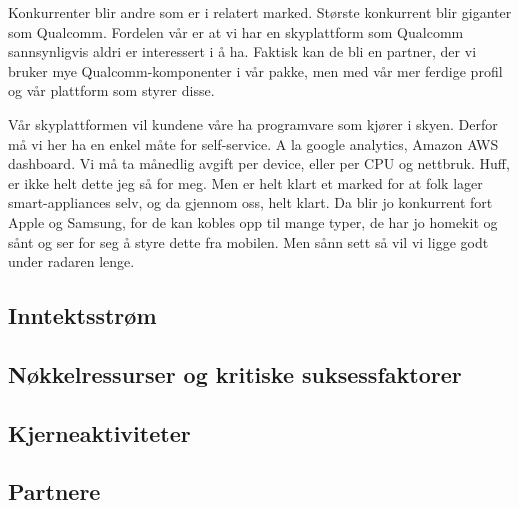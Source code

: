 Konkurrenter blir andre som er i relatert marked. Største konkurrent blir
giganter som Qualcomm. Fordelen vår er at vi har en skyplattform som Qualcomm
sannsynligvis aldri er interessert i å ha. Faktisk kan de bli en partner, der
vi bruker mye Qualcomm-komponenter i vår pakke, men med vår mer ferdige profil
og vår plattform som styrer disse.

Vår skyplattformen vil kundene våre ha programvare som kjører i skyen. Derfor
må vi her ha en enkel måte for self-service. A la google analytics, Amazon AWS
dashboard. Vi må ta månedlig avgift per device, eller per CPU og nettbruk.
Huff, er ikke helt dette jeg så for meg. Men er helt klart et marked for at
folk lager smart-appliances selv, og da gjennom oss, helt klart. Da blir jo
konkurrent fort Apple og Samsung, for de kan kobles opp til mange typer, de har
jo homekit og sånt og ser for seg å styre dette fra mobilen.
Men sånn sett så vil vi ligge godt under radaren lenge.

\subsection{Inntektsstrøm}

\subsection{Nøkkelressurser og kritiske suksessfaktorer}


\subsection{Kjerneaktiviteter}


\subsection{Partnere}



